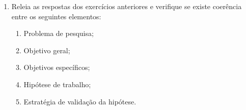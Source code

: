 \documentclass[10pt,a4paper]{extarticle}
\begin{document}
\begin{enumerate}[label=\textbf{\arabic*.}]
\item Releia as respostas dos exercícios anteriores e verifique se existe coerência entre os seguintes elementos:

\begin{enumerate}[label=(\alph*)]
    \item Problema de pesquisa;
    \item Objetivo geral;
    \item Objetivos específicos;
    \item Hipótese de trabalho;
    \item Estratégia de validação da hipótese.
\end{enumerate}

\end{enumerate}
\end{document}
